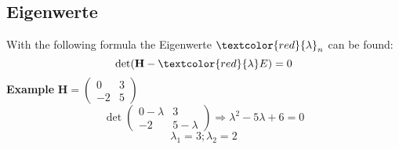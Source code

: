 \subsection{Eigenwerte}\label{eigenwerte}
With the following formula the Eigenwerte $\textcolor{red}{\lambda}_n$ can be found:
\begin{equation}
	\det(\mathbf{H} - \textcolor{red}{\lambda} E) = 0
\end{equation}
\noindent\textbf{Example}
$\mathbf{H} = \begin{pmatrix} 0 & 3 \\ -2 & 5 \end{pmatrix}$
\\
\[\det\begin{pmatrix}
	0 - \lambda & 3 \\
	-2 & 5 - \lambda
\end{pmatrix} \Rightarrow \lambda^2 - 5\lambda + 6 = 0\]
\[{\scriptstyle \lambda_1 = 3; \lambda_2 = 2}\]


